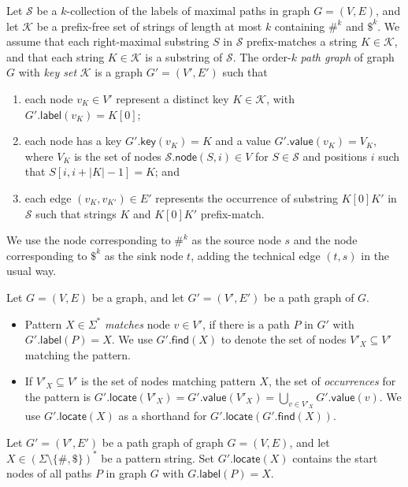 \documentclass[a4paper,UKenglish]{lipics-v2016}
\newcommand{\set}[1]{\ensuremath{\{ #1 \}}}
\newcommand{\abs}[1]{\ensuremath{\lvert #1 \rvert}}
\newcommand{\find}{\ensuremath{\mathsf{find}}}
\newcommand{\locate}{\ensuremath{\mathsf{locate}}}
\newcommand{\glabel}{\ensuremath{\mathsf{label}}}
\newcommand{\gkey}{\ensuremath{\mathsf{key}}}
\newcommand{\gvalue}{\ensuremath{\mathsf{value}}}
\newcommand{\gnode}{\ensuremath{\mathsf{node}}}
\newcommand{\kcollection}[1]{$#1$\nobreakdash-collection}
\newcommand{\orderk}[1]{order\nobreakdash-$#1$}
\begin{document}
\begin{definition}
Let $\mathcal{S}$ be a \kcollection{k} of the labels of maximal paths in graph $G = (V, E)$, and let $\mathcal{K}$ be a prefix-free set of strings of length at most $k$ containing $\#^{k}$ and $\$^{k}$. We assume that each right-maximal substring $S$ in $\mathcal{S}$ prefix-matches a string $K \in \mathcal{K}$, and that each string $K \in \mathcal{K}$ is a substring of $\mathcal{S}$. The \orderk{k} \emph{path graph} of graph $G$ with \emph{key set} $\mathcal{K}$ is a graph $G' = (V', E')$ such that
\begin{enumerate}
\item each node $v_{K} \in V'$ represent a distinct key $K \in \mathcal{K}$, with $G'.\glabel(v_{K}) = K[0]$;
\item each node has a key $G'.\gkey(v_{K}) = K$ and a value $G'.\gvalue(v_{K}) = V_{K}$, where $V_{K}$ is the set of nodes $\mathcal{S}.\gnode(S, i) \in V$ for $S \in \mathcal{S}$ and positions $i$ such that $S[i, i+\abs{K}-1] = K$; and
\item each edge $(v_{K}, v_{K'}) \in E'$ represents the occurrence of substring $K[0] K'$ in $\mathcal{S}$ such that strings $K$ and $K[0] K'$ prefix-match.
\end{enumerate}
We use the node corresponding to $\#^{k}$ as the source node $s$ and the node corresponding to $\$^{k}$ as the sink node $t$, adding the technical edge $(t, s)$ in the usual way.
\end{definition}

\begin{definition}
Let $G = (V, E)$ be a graph, and let $G' = (V', E')$ be a path graph of $G$.
\begin{itemize}
\item Pattern $X \in \Sigma^{\ast}$ \emph{matches} node $v \in V'$, if there is a path $P$ in $G'$ with $G'.\glabel(P) = X$. We use $G'.\find(X)$ to denote the set of nodes $V'_{X} \subseteq V'$ matching the pattern.
\item If $V'_{X} \subseteq V'$ is the set of nodes matching pattern $X$, the set of \emph{occurrences} for the pattern is $G'.\locate(V'_{X}) = G'.\gvalue(V'_{X}) = \bigcup_{v \in V'_{X}} G'.\gvalue(v)$. We use $G'.\locate(X)$ as a shorthand for $G'.\locate(G'.\find(X))$.
\end{itemize}
\end{definition}

\begin{lemma}\label{lemma:pg-fn}
Let $G' = (V', E')$ be a path graph of graph $G = (V, E)$, and let $X \in (\Sigma \setminus \set{\#, \$})^{\ast}$ be a pattern string. Set $G'.\locate(X)$ contains the start nodes of all paths $P$ in graph $G$ with $G.\glabel(P) = X$.
\end{lemma}
\end{document}
